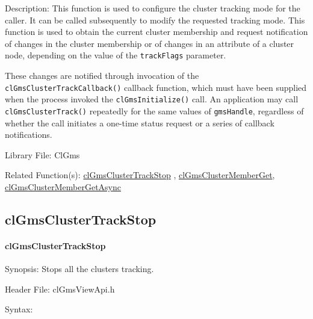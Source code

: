 \begin{flushleft}
\begin{Desc}
\end{Desc}
\begin{Desc}
\item[Description:]This function is used to configure the cluster tracking mode for the caller. It can be called subsequently to modify the requested 
tracking mode. This function is used to obtain the current cluster membership and request notification of changes in the cluster membership or of changes
in an attribute of a cluster node, depending on the value of the {\tt{track\-Flags}} parameter. \par
 \par
 These changes are notified through invocation of the {\tt{cl\-Gms\-Cluster\-Track\-Callback()}} callback function, which must have been supplied when the
 process invoked the {\tt{clGmsInitialize()}} call. An application may call {\tt{clGmsClusterTrack()}} repeatedly
 for the same values of {\tt{gms\-Handle}}, regardless of whether the call initiates a one-time status request or a series of callback notifications.
 \end{Desc}
\begin{Desc}
\item[Library File:]Cl\-Gms\end{Desc}
\begin{Desc}
\item[Related Function(s):]\hyperlink{pagegms104}{cl\-Gms\-Cluster\-Track\-Stop} , \hyperlink{pagegms110}{cl\-Gms\-Cluster\-Member\-Get},
\hyperlink{pagegms111}{cl\-Gms\-Cluster\-Member\-Get\-Async} \end{Desc}
\newpage


\subsection{clGmsClusterTrackStop}
\hypertarget{pagegms104}{}\paragraph{cl\-Gms\-Cluster\-Track\-Stop}\label{pagegms104}
\begin{Desc}
\item[Synopsis:]Stops all the clusters tracking.\end{Desc}
\begin{Desc}
\item[Header File:]clGmsViewApi.h\end{Desc}
\begin{Desc}
\item[Syntax:]


\end{Desc}
\end{flushleft}
